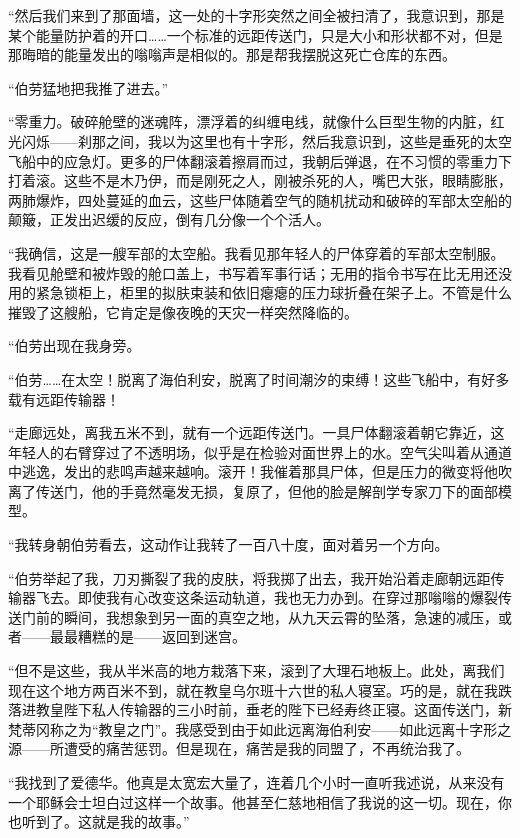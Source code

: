 \documentclass[AutoFakeBold=true]{book}
\begin{document}
``然后我们来到了那面墙，这一处的十字形突然之间全被扫清了，我意识到，那是某个能量防护着的开口……一个标准的远距传送门，只是大小和形状都不对，但是那晦暗的能量发出的嗡嗡声是相似的。那是帮我摆脱这死亡仓库的东西。

``伯劳猛地把我推了进去。''

\vspace*{1em}

``零重力。破碎舱壁的迷魂阵，漂浮着的纠缠电线，就像什么巨型生物的内脏，红光闪烁——刹那之间，我以为这里也有十字形，然后我意识到，这些是垂死的太空飞船中的应急灯。更多的尸体翻滚着擦肩而过，我朝后弹退，在不习惯的零重力下打着滚。这些不是木乃伊，而是刚死之人，刚被杀死的人，嘴巴大张，眼睛膨胀，两肺爆炸，四处蔓延的血云，这些尸体随着空气的随机扰动和破碎的军部太空船的颠簸，正发出迟缓的反应，倒有几分像一个个活人。

``我确信，这是一艘军部的太空船。我看见那年轻人的尸体穿着的军部太空制服。我看见舱壁和被炸毁的舱口盖上，书写着军事行话；无用的指令书写在比无用还没用的紧急锁柜上，柜里的拟肤束装和依旧瘪瘪的压力球折叠在架子上。不管是什么摧毁了这艘船，它肯定是像夜晚的天灾一样突然降临的。

``伯劳出现在我身旁。

{\kaishu ``伯劳……在太空！脱离了海伯利安，脱离了时间潮汐的束缚！这些飞船中，有好多载有远距传输器！}

``走廊远处，离我五米不到，就有一个远距传送门。一具尸体翻滚着朝它靠近，这年轻人的右臂穿过了不透明场，似乎是在检验对面世界上的水。空气尖叫着从通道中逃逸，发出的悲鸣声越来越响。滚开！我催着那具尸体，但是压力的微变将他吹离了传送门，他的手竟然毫发无损，复原了，但他的脸是解剖学专家刀下的面部模型。

``我转身朝伯劳看去，这动作让我转了一百八十度，面对着另一个方向。

``伯劳举起了我，刀刃撕裂了我的皮肤，将我掷了出去，我开始沿着走廊朝远距传输器飞去。即使我有心改变这条运动轨道，我也无力办到。在穿过那嗡嗡的爆裂传送门前的瞬间，我想象到另一面的真空之地，从九天云霄的坠落，急速的减压，或者——最最糟糕的是——返回到迷宫。

``但不是这些，我从半米高的地方栽落下来，滚到了大理石地板上。此处，离我们现在这个地方两百米不到，就在教皇乌尔班十六世的私人寝室。巧的是，就在我跌落进教皇陛下私人传输器的三小时前，垂老的陛下已经寿终正寝。这面传送门，新梵蒂冈称之为``教皇之门''。我感受到由于如此远离海伯利安——如此远离十字形之源——所遭受的痛苦惩罚。但是现在，痛苦是我的同盟了，不再统治我了。

``我找到了爱德华。他真是太宽宏大量了，连着几个小时一直听我述说，从来没有一个耶稣会士坦白过这样一个故事。他甚至仁慈地相信了我说的这一切。现在，你也听到了。这就是我的故事。''
\end{document}
